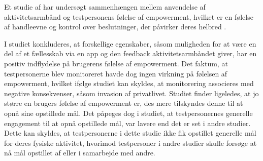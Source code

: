 Et studie af \citeauthor{nelson2016} har undersøgt sammenhængen mellem anvendelse af aktivitetsarmbånd og testpersonens følelse af empowerment, hvilket er en følelse af handleevne og kontrol over beslutninger, der påvirker deres helbred \citep{toennesen2005}.

I studiet konkluderes, at forskellige egenskaber, såsom muligheden for at være en del af et fællesskab via en app og den feedback aktivitetsarmbåndet giver, har en positiv indflydelse på brugerens følelse af empowerment. Det faktum, at testpersonerne blev monitoreret havde dog ingen virkning på følelsen af empowerment, hvilket ifølge studiet kan skyldes, at monitorering associeres med negative konsekvenser, såsom invasion af privatlivet.
Studiet finder ligeledes, at jo større en brugers følelse af empowerment er, des mere tilskyndes denne til at opnå sine opstillede mål. Det påpeges dog i studiet, at testpersonernes generelle engagement til at opnå opstillede mål, var lavere end det er set i andre studier. Dette kan skyldes, at testpersonerne i dette studie ikke fik opstillet generelle mål for deres fysiske aktivitet, hvorimod testpersoner i andre studier skulle forsøge at nå mål opstillet af eller i samarbejde med andre. 


